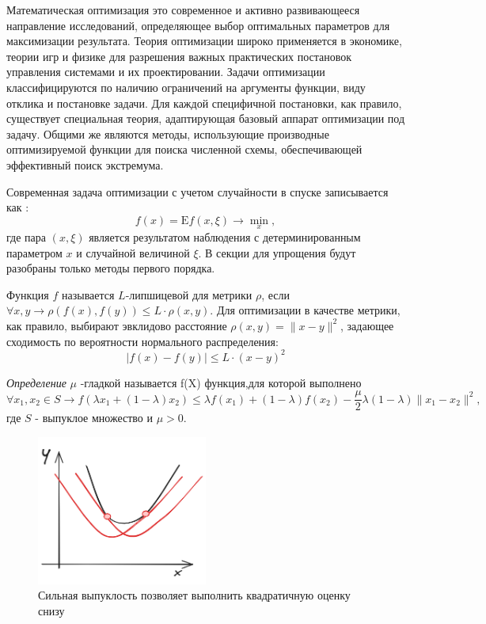 Математическая оптимизация это современное и активно развивающееся направление исследований, определяющее
выбор оптимальных параметров для максимизации результата. Теория оптимизации широко применяется в экономике,
теории игр и физике для разрешения важных практических постановок управления системами и их проектировании. 
Задачи оптимизации классифицируются по наличию ограничений на аргументы функции, виду отклика и постановке задачи. 
Для каждой специфичной постановки, как правило, существует специальная теория, адаптирующая базовый аппарат 
оптимизации под задачу. Общими же являются методы, использующие производные оптимизируемой функции для поиска 
численной схемы, обеспечивающей эффективный поиск экстремума.

Современная задача оптимизации с учетом случайности в спуске записывается как \cite{nesterov2015universal}:
\begin{equation}
    f(x) = \mathrm{E} f(x,\xi) \rightarrow \min_x,
\end{equation}
где пара $(x,\xi)$ является результатом наблюдения с детерминированным параметром $x$ и случайной величиной $\xi$.
В секции для упрощения будут разобраны только методы первого порядка.

 Функция $f$ называется $L$-липшицевой для метрики $\rho$, 
если $\forall x,y \rightarrow \rho(f(x),f(y)) \le L \cdot \rho(x,y)$.
Для оптимизации в качестве метрики, как правило, выбирают эвклидово расстояние $\rho(x,y) =\|x-y \|^2$, задающее 
сходимость по вероятности нормального распределения:   
\begin{equation}
    |f(x) - f(y)| \le L \cdot (x-y)^2
\end{equation}

\textit{Определение} $\mu$ -гладкой называется f(X) функция,для которой выполнено \begin{equation}
   \forall x_1,x_2 \in S \rightarrow f(\lambda x_1 + (1-\lambda)x_2) \le \lambda f(x_1) + (1-\lambda) f(x_2) - \frac{\mu}{2} \lambda (1-\lambda) \| x_1 - x_2 \|^2,
\end{equation}
где $S$ - выпуклое множество и $\mu > 0$. 

\begin{figure}[h]
    \centering
    \includegraphics[width=0.5\textwidth]{assets/math/optimization/strong_convex.excalidraw.png}
    \caption{Сильная выпуклость позволяет выполнить квадратичную оценку снизу}
    \label{strong_convex}
\end{figure}


